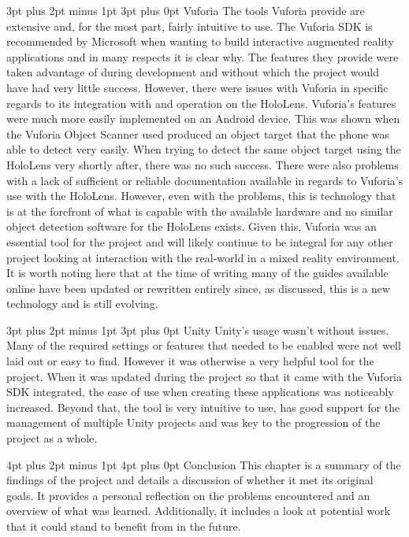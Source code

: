 \documentclass[12pt,a4paper,oneside]{article}
\makeatletter
\renewcommand\subsubsection{\@startsection {subsubsection}{1}{0mm} %
	                           {3pt plus 2pt minus 1pt} %
	                           {3pt plus 0pt} %
	                           {\normalfont\bfseries}}
\renewcommand\section{\@startsection {section}{1}{0mm} %
                               {4pt plus 2pt minus 1pt} %
                               {4pt plus 0pt} %
                               {\Large\bfseries}}
\makeatother
\begin{document}
\subsubsection{Vuforia}
The tools Vuforia provide are extensive and, for the most part, fairly intuitive to use. The Vuforia SDK is recommended by Microsoft when wanting to build interactive augmented reality applications and in many respects it is clear why. The features they provide were taken advantage of during development and without which the project would have had very little success. However, there were issues with Vuforia in specific regards to its integration with and operation on the HoloLens. Vuforia's features were much more easily implemented on an Android device. This was shown when the Vuforia Object Scanner used produced an object target that the phone was able to detect very easily. When trying to detect the same object target using the HoloLens very shortly after, there was no such success. There were also problems with a lack of sufficient or reliable documentation available in regards to Vuforia's use with the HoloLens. However, even with the problems, this is technology that is at the forefront of what is capable with the available hardware and no similar object detection software for the HoloLens exists. Given this, Vuforia was an essential tool for the project and will likely continue to be integral for any other project looking at interaction with the real-world in a mixed reality environment. It is worth noting here that at the time of writing many of the guides available online have been updated or rewritten entirely since, as discussed, this is a new technology and is still evolving.

\subsubsection{Unity}
Unity's usage wasn't without issues. Many of the required settings or features that needed to be enabled were not well laid out or easy to find. However it was otherwise a very helpful tool for the project. When it was updated during the project so that it came with the Vuforia SDK integrated, the ease of use when creating these applications was noticeably increased. Beyond that, the tool is very intuitive to use, has good support for the management of multiple Unity projects and was key to the progression of the project as a whole.
 
\newpage
\section{Conclusion}
This chapter is a summary of the findings of the project and details a discussion of whether it met its original goals. It provides a personal reflection on the problems encountered and an overview of what was learned. Additionally, it includes a look at potential work that it could stand to benefit from in the future.
\end{document}
